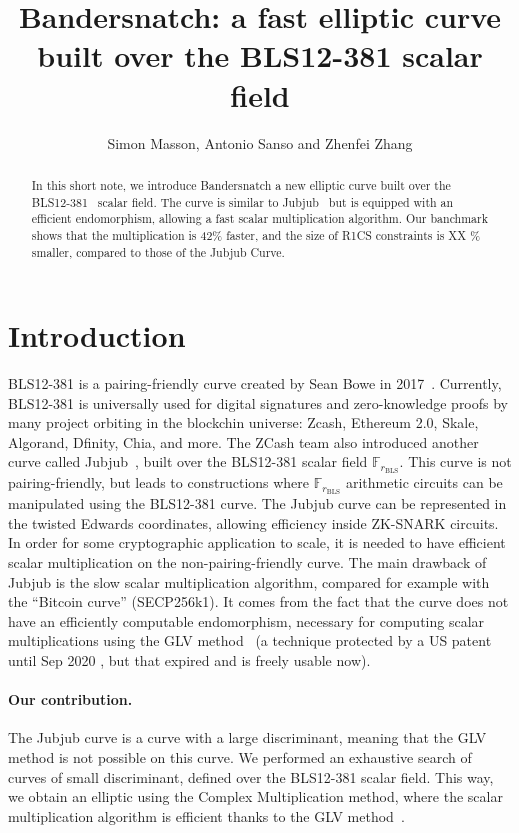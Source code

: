 \documentclass{article}
\title{Bandersnatch: a fast elliptic curve built over the BLS12-381
  scalar field}
\author{Simon Masson, Antonio Sanso and Zhenfei Zhang}
\makeatletter
\theoremstyle{definition}
\newcommand{\verbatimfont}[1]{\renewcommand{\verbatim@font}{\ttfamily#1}}
\makeatother
\begin{document}
\verbatimfont{\small}%

\maketitle
\medskip
\begin{abstract}
 In this short note, we introduce Bandersnatch a new elliptic curve
 built over the BLS12-381~\cite{bls12381} scalar field. The curve is
 similar to Jubjub~\cite{jubjub} but is equipped with an efficient
 endomorphism, allowing a fast scalar multiplication algorithm.
 Our banchmark shows that the multiplication is 42\% faster, 
 and the size of R1CS constraints is XX \% smaller, 
 compared to those of the Jubjub Curve.
\end{abstract}

\section{Introduction}
BLS12-381 is a pairing-friendly curve created by Sean Bowe in
2017~\cite{bls12381}.
Currently, BLS12-381 is universally used for digital
signatures and zero-knowledge proofs by many project orbiting in the
blockchin universe: Zcash, Ethereum 2.0, Skale, Algorand, Dfinity,
Chia, and more.
The ZCash team also introduced another curve called
Jubjub~\cite{jubjub}, built over the BLS12-381 scalar field $\mathbb
F_{r_\text{BLS}}$.
This curve is not pairing-friendly, but leads to constructions where
$\mathbb F_{r_\text{BLS}}$ arithmetic circuits can be manipulated
using the BLS12-381 curve.
The Jubjub curve can be represented in the twisted Edwards
coordinates, allowing efficiency inside ZK-SNARK circuits.
In order for some cryptographic application to scale, it is needed to
have efficient scalar multiplication on the non-pairing-friendly
curve.
The main drawback of Jubjub is the slow scalar multiplication
algorithm, compared for example with the ``Bitcoin curve''
(SECP256k1).
It comes from the fact that the curve does not have an efficiently
computable endomorphism, necessary for computing scalar
multiplications using the GLV method~\cite{C:GalLamVan01} (a technique
protected by a US patent until Sep 2020 \cite{glvpatent}, but that 
expired and is
freely usable now).

\paragraph{Our contribution.}
The Jubjub curve is a curve with a large discriminant, meaning that
the GLV method is not possible on this curve.
We performed an exhaustive search of curves of small discriminant,
defined over the BLS12-381 scalar field. This way, we obtain an
elliptic using the Complex Multiplication method, where the scalar
multiplication algorithm is efficient thanks to the GLV
method~\cite{C:GalLamVan01}.
\end{document}
